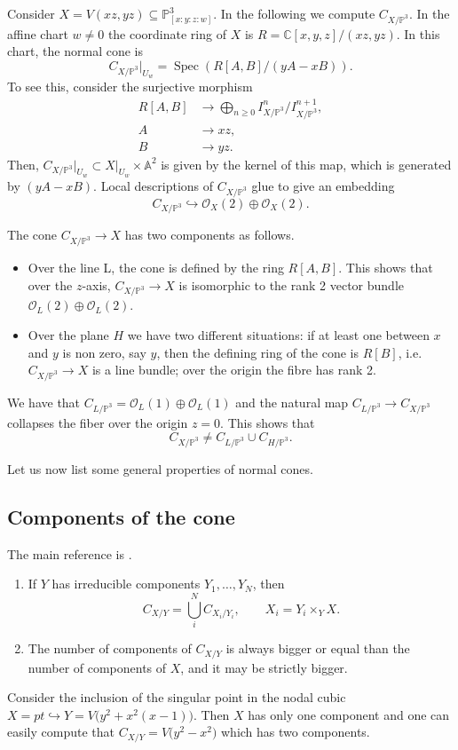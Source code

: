 \documentclass[pdftex]{sigma}
\numberwithin{equation}{section}
\newcommand{\PP}{\mathbb P}
\theoremstyle{plain}
\theoremstyle{definition}
\theoremstyle{remark}
\begin{document}
\begin{Example}\label{main example cone}
Consider $X=V(xz,yz)\subseteq\PP^3_{[x:y:z:w]}$. In the following we compute $C_{X/\PP^3}$. In the affine chart $w\neq 0$ the coordinate ring of $X$ is $R=\mathbb C[x,y,z]/(xz,yz)$. In this chart, the normal cone is
\[
C_{X/\PP^3}\rvert_{U_w}=\operatorname{Spec}\left(R[A,B]/(yA-xB)\right).
\]
To see this, consider the surjective morphism
 \begin{align*}
 R[A,B] & \rightarrow \bigoplus_{n\geq 0}{I^n_{X/\PP^3}/I^{n+1}_{X/\PP^3}},\\
 A &\rightarrow xz,\\
 B &\rightarrow yz.
 \end{align*}
Then, $C_{X/\PP^3}\rvert_{U_w}\subset X\rvert_{U_w}\times \mathbb{A}^2$ is given by the kernel of this map, which is generated by $(yA-xB)$. Local descriptions of $C_{X/\PP^3}$ glue to give an embedding
 \[
 C_{X/\PP^3}\hookrightarrow\mathcal O_X(2)\oplus\mathcal O_X(2).
 \]

The cone $C_{X/\PP^3}\to X$ has two components as follows.
\begin{itemize}\itemsep=0pt
\item Over the line L, the cone is defined by the ring $R[A,B]$. This shows that over the $z$-axis, $C_{X/\PP^3}\to X$ is isomorphic to the rank 2 vector bundle $\mathcal{O}_L(2)\oplus\mathcal O_L(2)$.
\item Over the plane $H$ we have two different situations: if at least one between $x$ and $y$ is non zero, say $y$, then the defining ring of the cone is $R[B]$, i.e. $C_{X/\PP^3}\to X$ is a line bundle; over the origin the fibre has rank 2.
\end{itemize}
We have that $C_{L/\PP^3}=\mathcal{O}_L(1)\oplus\mathcal O_L(1)$ and the natural map $C_{L/\PP^3}\to C_{X/\PP^3}$ collapses the fiber over the origin $z=0$. This shows that
\[C_{X/\PP^3}\neq C_{L/\PP^3}\cup C_{H/\PP^3}.\]

\end{Example}


Let us now list some general properties of normal cones.

\subsection{Components of the cone} The main reference is \cite[Section~4.1]{Fulton}.
\begin{enumerate}\itemsep=0pt
\item If $Y$ has irreducible components $Y_1,\dots, Y_N$, then
 \[C_{X/Y}=\bigcup_i^N C_{X_i/Y_i},\qquad X_i=Y_i\times_Y X.\]
 \item The number of components of $C_{X/Y}$ is always bigger or equal than the number of components of $X$, and it may be strictly bigger.
\end{enumerate}
 \begin{Example}Consider the inclusion of the singular point in the nodal cubic $X=pt\hookrightarrow Y=V\big(y^2+x^2(x-1)\big)$. Then $X$ has only one component and one can easily compute that $C_{X/Y}=V\big(y^2-x^2\big)$ which has two components.
 \end{Example}
\end{document}
